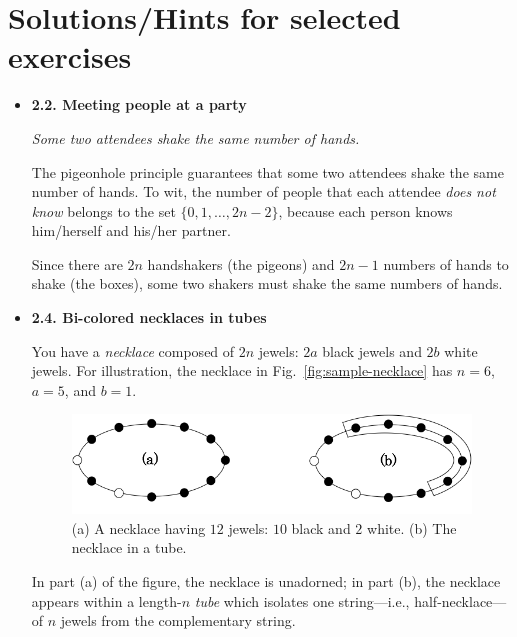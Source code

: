 
\chapter{Solutions/Hints for selected exercises}
\label{ch:Exercises}




\begin{itemize}
\item
{\bf 2.2. Meeting people at a party}

{\em Some two attendees shake the same number of hands.}
\medskip

The pigeonhole principle guarantees that some two attendees shake the same
number of hands.  To wit, the number of people that each attendee {\em
  does not know} belongs to the set $\{ 0, 1, \ldots, 2n-2 \}$,
because each person knows him/herself and his/her partner.  

Since there are $2n$ handshakers (the pigeons) and $2n-1$ numbers of hands
to shake (the boxes), some two shakers must shake the same numbers of
hands. 
\medskip
\item
{\bf 2.4. Bi-colored necklaces in tubes}

You have a {\it necklace} composed of $2n$ jewels: $2a$ black jewels and $2b$ white jewels.  For illustration, the necklace in Fig.~\ref{fig:sample-necklace} has $n = 6$, $a = 5$, and $b =1$.
\begin{figure}[ht]
\begin{center}
       \includegraphics[scale=0.35]{FiguresMaths/SampleNecklace}
\caption{(a) A necklace having $12$ jewels: $10$ black and $2$ white.  (b) The necklace in a tube.}
\end{center}
\end{figure}

In part (a) of the figure, the necklace is unadorned; in part (b), the necklace appears within a length-$n$ {\it tube} which isolates one string---i.e., half-necklace---of $n$ jewels from the complementary string.


\end{itemize}
